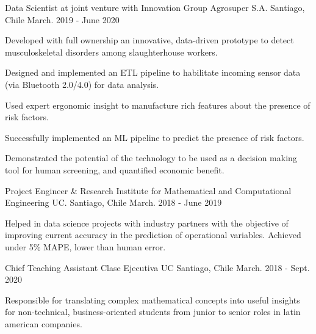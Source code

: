 

\begin{cventries}


\cventry
{Data Scientist at joint venture with Innovation Group} %
{Agrosuper S.A.} %
{Santiago, Chile} %
{March. 2019 - June 2020} %
{
  \begin{cvitems} %
    \item {Developed with full ownership an innovative, data-driven prototype to detect musculoskeletal disorders among slaughterhouse workers.}
    \item {Designed and implemented an ETL pipeline to habilitate incoming sensor data (via Bluetooth 2.0/4.0) for data analysis.}
    \item {Used expert ergonomic insight to manufacture rich features about the presence of risk factors.}
    \item {Successfully implemented an ML pipeline to predict the presence of risk factors.}
    \item {Demonstrated the potential of the technology to be used as a decision making tool for human screening, and quantified economic benefit.}
  \end{cvitems}
}
\cventry
{Project Engineer \& Research} %
{Institute for Mathematical and Computational Engineering UC.} %
{Santiago, Chile} %
{March. 2018 - June 2019} %
{
  \begin{cvitems} %
    \item {Helped in data science projects with industry partners with the objective of improving current accuracy in
    the prediction of operational variables. Achieved under 5\% MAPE, lower than human error.}
  \end{cvitems}
}


\cventry
{Chief Teaching Assistant}
{Clase Ejecutiva UC} %
{Santiago, Chile} %
{March. 2018 - Sept. 2020} %
{
  \begin{cvitems} %
    \item {Responsible for translating complex mathematical concepts into useful insights for non-technical, business-oriented 
    students from junior to senior roles in latin american companies.}
  \end{cvitems}
}


\end{cventries}
